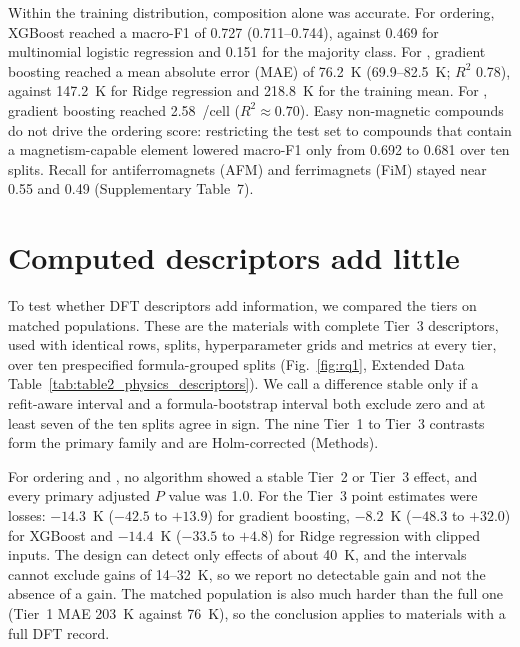 \documentclass[11pt,a4paper]{article}
\begin{document}
Within the training distribution, composition alone was accurate. For ordering, XGBoost\cite{chen2016xgboost} reached a macro-F1 of 0.727 (0.711--0.744), against 0.469 for multinomial logistic regression and 0.151 for the majority class. For \Tc{}, gradient boosting\cite{ke2017lightgbm,pedregosa2011sklearn} reached a mean absolute error (MAE) of 76.2~K (69.9--82.5~K; $R^2$ 0.78), against 147.2~K for Ridge regression and 218.8~K for the training mean. For \mcell{}, gradient boosting reached 2.58~\muB{}/cell ($R^2\approx0.70$). Easy non-magnetic compounds do not drive the ordering score: restricting the test set to compounds that contain a magnetism-capable element lowered macro-F1 only from 0.692 to 0.681 over ten splits. Recall for antiferromagnets (AFM) and ferrimagnets (FiM) stayed near 0.55 and 0.49 (Supplementary Table~7).

\section*{Computed descriptors add little}\label{sec:rq1}

To test whether DFT descriptors add information, we compared the tiers on matched populations. These are the materials with complete Tier~3 descriptors, used with identical rows, splits, hyperparameter grids and metrics at every tier, over ten prespecified formula-grouped splits (Fig.~\ref{fig:rq1}, Extended Data Table~\ref{tab:table2_physics_descriptors}). We call a difference stable only if a refit-aware interval\cite{nadeau2003inference} and a formula-bootstrap interval both exclude zero and at least seven of the ten splits agree in sign. The nine Tier~1 to Tier~3 contrasts form the primary family and are Holm-corrected\cite{holm1979simple} (Methods).

For ordering and \Tc{}, no algorithm showed a stable Tier~2 or Tier~3 effect, and every primary adjusted $P$ value was 1.0. For \Tc{} the Tier~3 point estimates were losses: $-14.3$~K ($-42.5$ to $+13.9$) for gradient boosting, $-8.2$~K ($-48.3$ to $+32.0$) for XGBoost and $-14.4$~K ($-33.5$ to $+4.8$) for Ridge regression with clipped inputs. The design can detect only effects of about 40~K, and the intervals cannot exclude gains of 14--32~K, so we report no detectable gain and not the absence of a gain. The matched \Tc{} population is also much harder than the full one (Tier~1 MAE 203~K against 76~K), so the conclusion applies to materials with a full DFT record.
\end{document}
